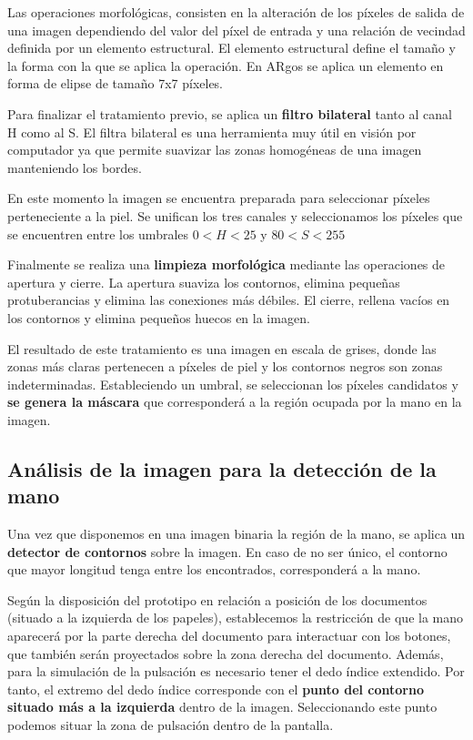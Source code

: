 Las operaciones morfológicas, consisten en la alteración de los píxeles
de salida de una imagen dependiendo del valor del píxel de entrada y
una relación de vecindad definida por un elemento estructural. El
elemento estructural define el tamaño y la forma con la que se aplica
la operación. En ARgos se aplica un elemento en forma de elipse de
tamaño 7x7 píxeles.

Para finalizar el tratamiento previo, se aplica un \textbf{filtro bilateral}
tanto al canal H como al S. El filtra bilateral es una herramienta muy
útil en visión por computador ya que permite suavizar las zonas
homogéneas de una imagen manteniendo los bordes.

En este momento la imagen se encuentra preparada para seleccionar
píxeles perteneciente a la piel. Se unifican los tres canales y
seleccionamos los píxeles que se encuentren entre los umbrales
$0 < H < 25$ y $80 < S < 255$

Finalmente se realiza una \textbf{limpieza morfológica} mediante las operaciones de
apertura y cierre. La apertura suaviza los contornos, elimina pequeñas
protuberancias y elimina las conexiones más débiles. El cierre,
rellena vacíos en los contornos y elimina pequeños huecos en la
imagen.

El resultado de este tratamiento es una imagen en escala de grises,
donde las zonas más claras pertenecen a píxeles de piel y los
contornos negros son zonas indeterminadas. Estableciendo un umbral, se
seleccionan los píxeles candidatos y \textbf{se genera la máscara} que
corresponderá a la región ocupada por la mano en la imagen.

\subsection{Análisis de la imagen para la detección de la mano}
Una vez que disponemos en una imagen binaria la región de la mano,
se aplica un \textbf{detector de contornos} sobre la imagen. En caso de no ser
único, el contorno que mayor longitud tenga entre los encontrados, corresponderá
a la mano.

Según la disposición del prototipo en relación a posición de los
documentos (situado a la izquierda de los papeles), establecemos la restricción de que la mano aparecerá por
la parte derecha del documento para interactuar con los botones, que
también serán proyectados sobre la zona derecha del documento. Además,
para la simulación de la pulsación es necesario tener el dedo índice
extendido. Por tanto, el extremo del dedo índice corresponde con el
 \textbf{punto del contorno situado más a la izquierda} dentro de la
imagen. Seleccionando este punto podemos situar la zona de pulsación
dentro de la pantalla.

